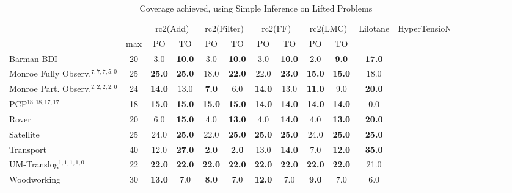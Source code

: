 \documentclass[letterpaper]{article} %
\begin{document}
\begin{table}
	\centering
	\caption{Coverage achieved, using Simple Inference on Lifted Problems}
	\label{table:LiftedSimpleCoverage}
	\scalebox{0.6} {
		\begin{tabular}{lccccccccccccccccccl} 
			\toprule 
			&& \multicolumn{2}{c}{rc2(Add)} & \multicolumn{2}{c}{rc2(Filter)} & \multicolumn{2}{c}{rc2(FF)} & \multicolumn{2}{c}{rc2(LMC)}  & \multicolumn{2}{c}{Lilotane} & \multicolumn{2}{c}{HyperTensioN} \\  
			\cmidrule(lr){3-4} \cmidrule(lr){5-6} \cmidrule(lr){7-8} \cmidrule(lr){9-10} \cmidrule(lr){11-12}   \cmidrule(lr){13-14} 
			& max &PO & TO & PO & TO & PO & TO & PO &  TO  \\ 
			\midrule 
			Barman-BDI & 20 & 3.0 & \textbf{10.0} & 3.0 & \textbf{10.0} & 3.0 & \textbf{10.0} & 2.0 & \textbf{9.0} &\multicolumn{2}{c}{ \textbf{17.0}  } \\ 
			Monroe Fully Observ.$^{7,7,7,5,0}$ & 25 & \textbf{25.0} & \textbf{25.0} & 18.0 & \textbf{22.0} & 22.0 & \textbf{23.0} & \textbf{15.0} & \textbf{15.0} &\multicolumn{2}{c}{ 18.0  } \\ 
			Monroe Part. Observ.$^{2,2,2,2,0}$ & 24 & \textbf{14.0} & 13.0 & \textbf{7.0} & 6.0 & \textbf{14.0} & 13.0 & \textbf{11.0} & 9.0 &\multicolumn{2}{c}{ \textbf{20.0}  } \\ 
			PCP$^{18,18,17,17}$ & 18 & \textbf{15.0} & \textbf{15.0} & \textbf{15.0} & \textbf{15.0} & \textbf{14.0} & \textbf{14.0} & \textbf{14.0} & \textbf{14.0} &\multicolumn{2}{c}{ 0.0  } \\ 
			Rover & 20 & 6.0 & \textbf{15.0} & 4.0 & \textbf{13.0} & 4.0 & \textbf{14.0} & 4.0 & \textbf{13.0} &\multicolumn{2}{c}{ \textbf{20.0}  } \\ 
			Satellite & 25 & 24.0 & \textbf{25.0} & 22.0 & \textbf{25.0} & \textbf{25.0} & \textbf{25.0} & 24.0 & \textbf{25.0} &\multicolumn{2}{c}{ \textbf{25.0}  } \\ 
			Transport & 40 & 12.0 & \textbf{27.0} & \textbf{2.0} & \textbf{2.0} & 13.0 & \textbf{14.0} & 7.0 & \textbf{12.0} &\multicolumn{2}{c}{ \textbf{35.0}  } \\ 
			UM-Translog$^{1,1,1,1,0}$ & 22 & \textbf{22.0} & \textbf{22.0} & \textbf{22.0} & \textbf{22.0} & \textbf{22.0} & \textbf{22.0} & \textbf{22.0} & \textbf{22.0} &\multicolumn{2}{c}{ 21.0  } \\ 
			Woodworking & 30 & \textbf{13.0} & 7.0 & \textbf{8.0} & 7.0 & \textbf{12.0} & 7.0 & \textbf{9.0} & 7.0 &\multicolumn{2}{c}{ 6.0  } \\ 

\end{tabular}}
\end{table}
\end{document}
